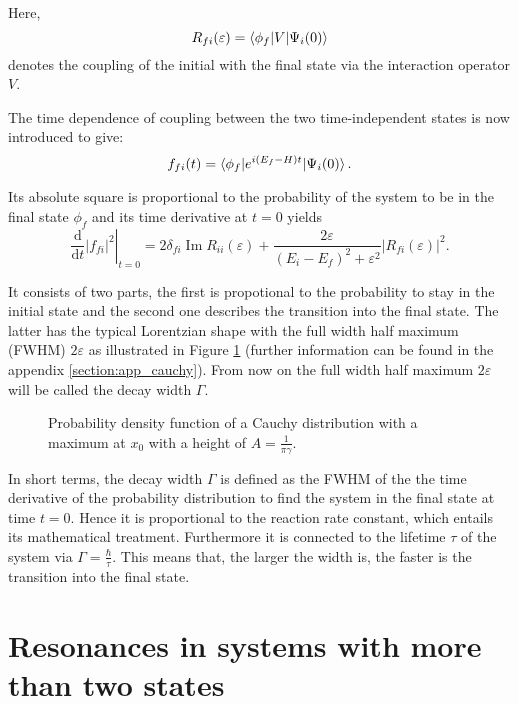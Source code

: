 Here, 
\begin{equation}
  R_{fi}(\varepsilon) = \braket{\phi_f|V|\Psi_i(0)}
\end{equation}
denotes the coupling of the initial with the final state via the interaction
operator $V$.

The time dependence of coupling between the two time-independent states is now
introduced to give:
\begin{equation}
  f_{fi}(t) = \braket{\phi_f| e^{i(E_f-H)t} |\Psi_i(0)} .
\end{equation}

Its absolute square is proportional to the probability of the system to be
in the final state $\phi_f$ and its time derivative at $t=0$ yields
\begin{equation}
  \left . \frac{\mathrm{d}}{\mathrm{d}t} |f_{fi}|^2 \right |_{t=0}
  = 2\delta_{fi} \operatorname{Im}R_{ii}(\varepsilon) 
    + \frac{2\varepsilon}{(E_i-E_f)^2+\varepsilon^2} |R_{fi}(\varepsilon)|^2 .
\end{equation}

It consists of two parts, the first is propotional to the probability to stay
in the initial state and the second one describes the transition into the
final state. The latter has the typical Lorentzian shape with the full width
half maximum
(FWHM) $2 \varepsilon$ as illustrated in Figure \ref{figure:general_resonance}
(further information can be found in the appendix
\ref{section:app_cauchy}). From now on
the full width half maximum ${2\varepsilon}$ will be called the
decay width $\Gamma$.

\begin{figure}[h]
  \centering
  
  \caption{Probability density function of a Cauchy distribution with a
           maximum at $x_0$ with a height of $A=\frac{1}{\pi\gamma}$.}
  \label{figure:general_resonance}
\end{figure}

In short terms, the decay width $\Gamma$ is defined as the FWHM of the
the time derivative of the probability distribution to find the system in
the final state at time $t=0$. Hence it is proportional to the reaction rate
constant, which entails its mathematical treatment. Furthermore it is
connected to the lifetime $\tau$ of the
system via $\Gamma=\frac \hbar \tau$.
This means that, the larger the width is, the faster is the transition
into the final state.


\section{Resonances in systems with more than two states}

